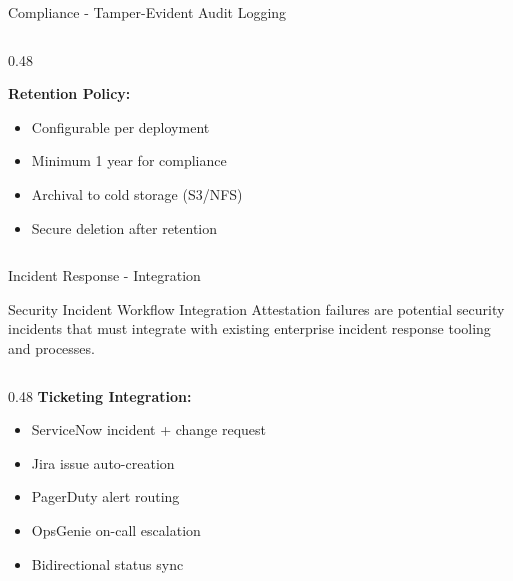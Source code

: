 \begin{frame}{Compliance - Tamper-Evident Audit Logging}
\begin{columns}[T]
\begin{column}{0.48\textwidth}
      \vspace{0.15cm}

      \textbf{Retention Policy:}
      \begin{itemize}
        \item Configurable per deployment
        \item Minimum 1 year for compliance
        \item Archival to cold storage (S3/NFS)
        \item Secure deletion after retention
      \end{itemize}
    \end{column}
  \end{columns}
\end{frame}

\begin{frame}{Incident Response - Integration}
  \begin{block}{Security Incident Workflow Integration}
    \scriptsize
    Attestation failures are potential security incidents that must integrate
    with existing enterprise incident response tooling and processes.
  \end{block}

  \vspace{0.1cm}

  \scriptsize
  \begin{columns}[T]
    \begin{column}{0.48\textwidth}
      \textbf{Ticketing Integration:}
      \begin{itemize}
        \setlength{\itemsep}{0pt}
        \item ServiceNow incident + change request
        \item Jira issue auto-creation
        \item PagerDuty alert routing
        \item OpsGenie on-call escalation
        \item Bidirectional status sync
      \end{itemize}

      \vspace{0.1cm}


\end{column}
\end{columns}
\end{frame}
